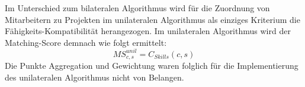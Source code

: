 Im Unterschied zum bilateralen Algorithmus wird für die Zuordnung von Mitarbeitern zu Projekten im unilateralen Algorithmus als einziges Kriterium die Fähigkeits-Kompatibilität herangezogen.
Im unilateralen Algorithmus wird der Matching-Score demnach wie folgt ermittelt:
\begin{equation}\label{methodik:eq:8}
    MS_{c,s}^{unil} = C_{Skills}(c,s)
\end{equation}
Die Punkte Aggregation und Gewichtung waren folglich für die Implementierung des unilateralen Algorithmus nicht von Belangen.





